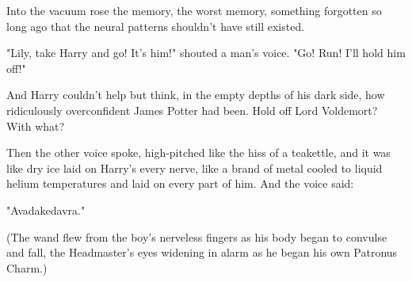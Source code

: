 Into the vacuum rose the memory, the worst memory, something forgotten so long
ago that the neural patterns shouldn't have still existed.

\begin{em}
"Lily, take Harry and go! It's him!" shouted a man's voice. "Go! Run!
I'll hold him off!"

And Harry couldn't help but think, in the empty depths of his dark side,
how ridiculously overconfident James Potter had been. Hold off Lord Voldemort?
With what?

Then the other voice spoke, high-pitched like the hiss of a teakettle,
and it was like dry ice laid on Harry's every nerve, like a brand of metal
cooled to liquid helium temperatures and laid on every part of him. And the
voice said:

"Avadakedavra."
\end{em}

(The wand flew from the boy's nerveless fingers as his body began to convulse
and fall, the Headmaster's eyes widening in alarm as he began his own Patronus
Charm.)

